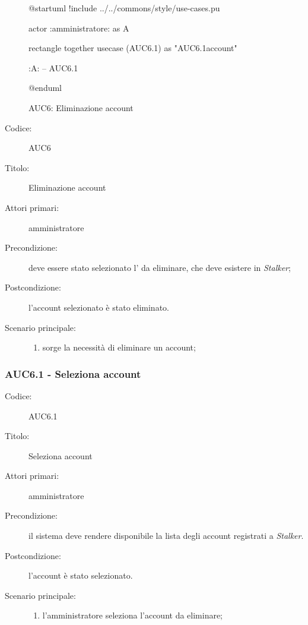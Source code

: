 \documentclass[../../../analisi-dei-requisiti.tex]{subfiles}
\begin{document}
\begin{figure}[H]
  \centering
  \begin{plantuml}
  @startuml
  !include ../../commons/style/use-cases.pu

  actor :amministratore: as A

  rectangle {
    together {
      usecase (AUC6.1) as "AUC6.1\nSeleziona account"
    }
  }

  :A: -- AUC6.1

  @enduml
  \end{plantuml}
  \caption{AUC6: Eliminazione account}
  \label{fig:auc6}
\end{figure}

\begin{description}
  \item[Codice:] AUC6
  \item[Titolo:] Eliminazione account
  \item[Attori primari:] amministratore
  \item[Precondizione:] deve essere stato selezionato l' da eliminare, che deve esistere in \emph{Stalker};
  \item[Postcondizione:] l'account selezionato è stato eliminato.
  \item[Scenario principale:]
  \begin{enumerate}
    \item sorge la necessità di eliminare un account;
  \end{enumerate}
\end{description}

\subsubsection{AUC6.1 - Seleziona account}%
\label{subs:AUC6.1}
\begin{description}
  \item[Codice:] AUC6.1
  \item[Titolo:] Seleziona account
  \item[Attori primari:] amministratore
  \item[Precondizione:] il sistema deve rendere disponibile la lista degli account registrati a \emph{Stalker}.
  \item[Postcondizione:] l'account è stato selezionato.
  \item[Scenario principale:]
  \begin{enumerate}
    \item l'amministratore seleziona l'account da eliminare;
  \end{enumerate}
\end{description}
\end{document}
